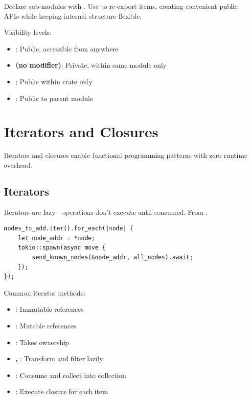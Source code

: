 Declare sub-modules with . Use  to re-export items, creating convenient public APIs while keeping internal structure flexible.

Visibility levels:
\begin{itemize}
  \item \textbf{}: Public, accessible from anywhere
  \item \textbf{(no modifier)}: Private, within same module only
  \item \textbf{}: Public within crate only
  \item \textbf{}: Public to parent module
\end{itemize}

\section{Iterators and Closures}
\label{sec:ch24-iterators-closures}

Iterators and closures enable functional programming patterns with zero runtime overhead.

\subsection{Iterators}
\label{subsec:ch24-iterators}

Iterators are lazy---operations don't execute until consumed. From :

\begin{listing}[htbp]
\caption{Iterator with for\_each}
\label{lst:ch24-iterator}
\begin{verbatim}
nodes_to_add.iter().for_each(|node| {
    let node_addr = *node;
    tokio::spawn(async move {
        send_known_nodes(&node_addr, all_nodes).await;
    });
});
\end{verbatim}
\end{listing}

Common iterator methods:
\begin{itemize}
  \item \textbf{}: Immutable references
  \item \textbf{}: Mutable references
  \item \textbf{}: Takes ownership
  \item \textbf{, }: Transform and filter lazily
  \item \textbf{}: Consume and collect into collection
  \item \textbf{}: Execute closure for each item
\end{itemize}

